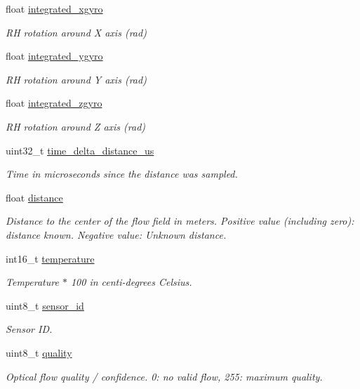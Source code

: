 \begin{DoxyCompactItemize}
float \hyperlink{struct____mavlink__optical__flow__rad__t_a8c0376467ce566ac5d2c2514b3bc9c75}{integrated\+\_\+xgyro}
\begin{DoxyCompactList}\small\item\em R\+H rotation around X axis (rad) \end{DoxyCompactList}\item 
float \hyperlink{struct____mavlink__optical__flow__rad__t_a60c6d175fc107f766d708fe407468469}{integrated\+\_\+ygyro}
\begin{DoxyCompactList}\small\item\em R\+H rotation around Y axis (rad) \end{DoxyCompactList}\item 
float \hyperlink{struct____mavlink__optical__flow__rad__t_a18f87c1bec8fe3e656967326437add8b}{integrated\+\_\+zgyro}
\begin{DoxyCompactList}\small\item\em R\+H rotation around Z axis (rad) \end{DoxyCompactList}\item 
uint32\+\_\+t \hyperlink{struct____mavlink__optical__flow__rad__t_a1581c7df4066597b07103c3d24002ecc}{time\+\_\+delta\+\_\+distance\+\_\+us}
\begin{DoxyCompactList}\small\item\em Time in microseconds since the distance was sampled. \end{DoxyCompactList}\item 
float \hyperlink{struct____mavlink__optical__flow__rad__t_ada976b8a6db1ec3228d745c9ad81d4f3}{distance}
\begin{DoxyCompactList}\small\item\em Distance to the center of the flow field in meters. Positive value (including zero)\+: distance known. Negative value\+: Unknown distance. \end{DoxyCompactList}\item 
int16\+\_\+t \hyperlink{struct____mavlink__optical__flow__rad__t_a1d864c4730f94d21dd2fcfa19b2ee7e4}{temperature}
\begin{DoxyCompactList}\small\item\em Temperature $\ast$ 100 in centi-\/degrees Celsius. \end{DoxyCompactList}\item 
uint8\+\_\+t \hyperlink{struct____mavlink__optical__flow__rad__t_a1aba9a5b85e33d09f1161661d95376c1}{sensor\+\_\+id}
\begin{DoxyCompactList}\small\item\em Sensor I\+D. \end{DoxyCompactList}\item 
uint8\+\_\+t \hyperlink{struct____mavlink__optical__flow__rad__t_a35206139e7148b28cabf4e12977ad315}{quality}
\begin{DoxyCompactList}\small\item\em Optical flow quality / confidence. 0\+: no valid flow, 255\+: maximum quality. \end{DoxyCompactList}\end{DoxyCompactItemize}


